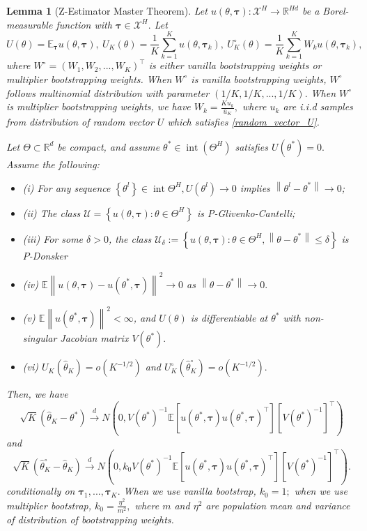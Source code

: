 \documentclass{article}
\numberwithin{equation}{section}
\theoremstyle{plain}
\newtheorem{lemma}[theorem]{Lemma}
\theoremstyle{definition}
\theoremstyle{remark}
\begin{document}
\begin{lemma}[Z-Estimator Master Theorem\citep{kosorok}]\label{Z_Estimator_thm}
Let $u(\theta,\boldsymbol{\tau}): \mathcal{X}^H \rightarrow \mathbb{R}^{Hd}$ be a Borel-measurable function with $\boldsymbol{\tau} \in \mathcal{X}^H.$ Let 
$$U(\theta)=\mathbb{E}_{\boldsymbol{\tau}} u(\theta,\boldsymbol{\tau}), \ U_{K}(\theta) = \frac{1}{K}\sum_{k=1}^K u(\theta,\boldsymbol{\tau}_k), \ U_{K}^\circ(\theta) = \frac{1}{K}\sum_{k=1}^K W_k u(\theta,\boldsymbol{\tau}_k),$$
where $W^\circ = \left(W_1,W_2,...,W_K\right)^{\top}$ is either vanilla bootstrapping weights or multiplier bootstrapping weights. When $W^\circ$ is vanilla bootstrapping weights, $W^\circ$ follows multinomial distribution with parameter $\left(1/K,1/K,...,1/K\right).$ When $W^\circ$ is multiplier bootstrapping weights, we have $W_k = \frac{K u_k}{\bar{u}_K},$ where $u_k$ are i.i.d samples from distribution of random vector $U$ which satisfies \eqref{random_vector_U}.

Let $\Theta \subset \mathbb{R}^{d}$ be compact, and assume $\theta^* \in \operatorname{int}(\Theta^H)$ satisfies $U\left(\theta^*\right)=0 .$ Assume the following:
\begin{itemize}
    \item (i) For any sequence $\left\{\theta^l\right\} \in \operatorname{int} \Theta^H, U\left(\theta^l\right) \rightarrow 0$ implies $\left\|\theta^l-\theta^*\right\| \rightarrow 0$;
    \item (ii) The class $\mathcal{U} = \left\{u(\theta,\boldsymbol{\tau}): \theta \in \Theta^H \right\}$ is P-Glivenko-Cantelli;
    \item (iii) For some $\delta>0$, the class $\mathcal{U}_{\delta}:=\left\{u(\theta,\boldsymbol{\tau}): \theta \in \Theta^H ,\left\|\theta-\theta^*\right\| \leq \delta\right\}$ is $P$-Donsker 
    \item (iv) $\mathbb{E} \left\|u(\theta ,\boldsymbol{\tau}) -u(\theta^*,\boldsymbol{\tau})\right\|^{2} \rightarrow 0$ as $\left\|\theta-\theta^*\right\| \rightarrow 0.$
    \item (v) $\mathbb{E} \left\|u(\theta^*,\boldsymbol{\tau})\right\|^{2}<\infty$, and $U(\theta)$ is differentiable at $\theta^*$ with non-singular Jacobian matrix $V(\theta^*).$
    \item (vi) $U_K(\widehat{\theta}_K) = o(K^{-1/2})$ and $U_K^\circ(\widehat{\theta}_K^{\circ}) = o(K^{-1/2}).$ 
\end{itemize}
Then, we have
$$
\sqrt{K}\left(\widehat{\theta}_K-\theta^*\right) \stackrel{d}{\rightarrow} N\left(0, V(\theta^*)^{-1} \mathbb{E}\left[u(\theta^*,\boldsymbol{\tau}) u(\theta^*,\boldsymbol{\tau})^{\top}\right]\left[V(\theta^*)^{-1}\right]^{\top}\right)
$$
and
$$
\sqrt{K}\left(\widehat{\theta}_K^{\circ}-\widehat{\theta}_K\right) \stackrel{d}{\rightarrow} N\left(0, k_0 V(\theta^*)^{-1} \mathbb{E}\left[u(\theta^*,\boldsymbol{\tau}) u(\theta^*,\boldsymbol{\tau})^{\top}\right]\left[V(\theta^*)^{-1}\right]^{\top}\right).
$$
conditionally on $\boldsymbol{\tau}_1,...,\boldsymbol{\tau}_K.$ When we use vanilla bootstrap, $k_0 = 1;$ when we use multiplier bootstrap, $k_0 = \frac{\eta^2}{m^2},$ where $m$ and $\eta^2$ are population mean and variance of distribution of bootstrapping weights.
\end{lemma}
\end{document}
